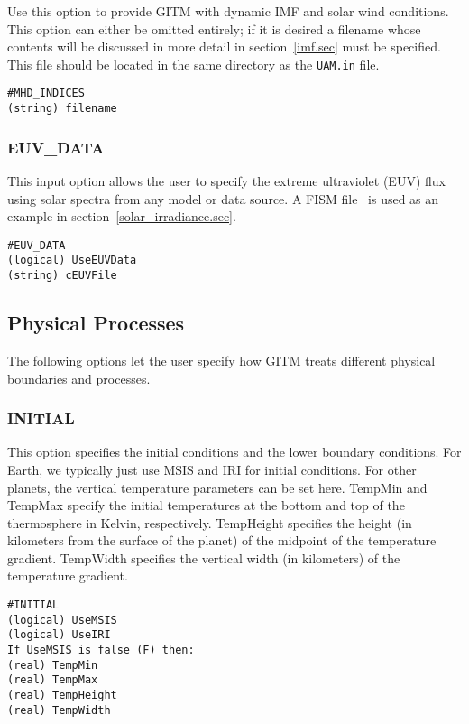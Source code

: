 Use this option to provide GITM with dynamic IMF and solar wind conditions.  This option can either be omitted entirely; if it is desired a filename whose contents will be discussed in more detail in section~\ref{imf.sec} must be specified.  This file should be located in the same directory as the {\tt UAM.in} file.

\begin{verbatim}
#MHD_INDICES
(string) filename
\end{verbatim}

\subsubsection{EUV\_DATA}
\label{euv.sec}

This input option allows the user to specify the extreme ultraviolet (EUV) flux using solar spectra from any model or data source.  A FISM file~\citep{fism:2007d, fism:2008f} is used as an example in section~\ref{solar_irradiance.sec}.

\begin{verbatim}
#EUV_DATA
(logical) UseEUVData   
(string) cEUVFile     
\end{verbatim}


\subsection{Physical Processes}
\label{physics.sec}

The following options let the user specify how GITM treats different physical boundaries and processes.

\subsubsection{INITIAL}
\label{initial.sec}

This option specifies the initial conditions and the lower boundary conditions.  For Earth, we typically just use MSIS and IRI for initial conditions.  For other planets, the vertical temperature parameters can be set here.  TempMin and TempMax specify the initial temperatures at the bottom and top of the thermosphere in Kelvin, respectively.  TempHeight specifies the height (in kilometers from the surface of the planet) of the midpoint of the temperature gradient.  TempWidth specifies the vertical width (in kilometers) of the temperature gradient. 

\begin{verbatim}
#INITIAL
(logical) UseMSIS
(logical) UseIRI 
If UseMSIS is false (F) then:
(real) TempMin      
(real) TempMax        
(real) TempHeight     
(real) TempWidth     
\end{verbatim}

